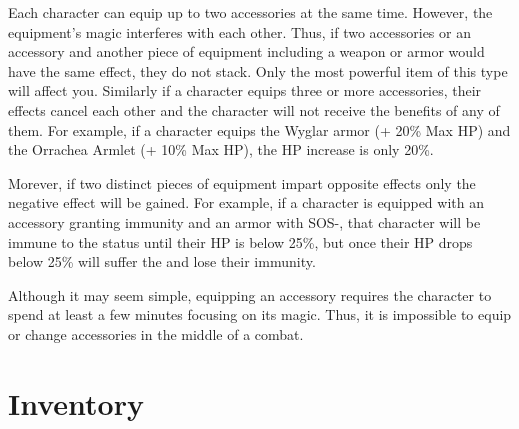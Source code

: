 \begin{multicols}{2}
Each character can equip up to two accessories at the same time.  However, the equipment's magic interferes with each other.  Thus, if two accessories or an accessory and another piece of equipment including a weapon or armor would have the same effect, they do not stack.  Only the most powerful item of this type will affect you.  Similarly if a character equips three or more accessories, their effects cancel each other and the character will not receive the benefits of any of them.  For example, if a character equips the Wyglar armor (+ 20\% Max HP) and the Orrachea Armlet (+ 10\% Max HP), the HP increase is only 20\%.

Morever, if two distinct pieces of equipment impart opposite effects only the negative effect will be gained.  For example, if a character is equipped with an accessory granting  immunity and an armor with SOS-, that character will be immune to the  status until their HP is below 25\%, but once their HP drops below 25\% will suffer the  and lose their immunity.

Although it may seem simple, equipping an accessory requires the character to spend at least a few minutes focusing on its magic.  Thus, it is impossible to equip or change accessories in the middle of a combat.
\end{multicols}

\begin{tabacc}[label=inv-acc1]
    
\end{tabacc}

\clearpage
\section{Inventory}\label{sec:inv-inventory}

